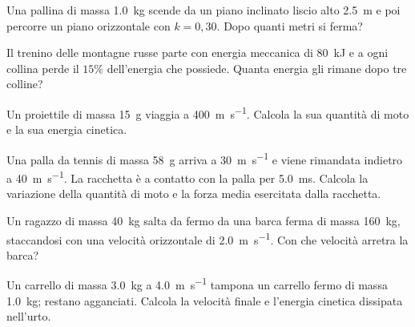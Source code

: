 \begin{esercizio}
Una pallina di massa \SI{1,0}{\kilo\gram} scende da un piano inclinato liscio alto \SI{2,5}{\metre} e poi percorre un piano orizzontale con $k = 0{,}30$. Dopo quanti metri si ferma?\\
\end{esercizio}

\begin{esercizio}
Il trenino delle montagne russe parte con energia meccanica di \SI{80}{\kilo\joule} e a ogni collina perde il $15\%$ dell'energia che possiede. Quanta energia gli rimane dopo tre colline?\\
\end{esercizio}

\begin{esercizio}
Un proiettile di massa \SI{15}{\gram} viaggia a \SI{400}{\metre\per\second}. Calcola la sua quantità di moto e la sua energia cinetica.\\
\end{esercizio}

\begin{esercizio}
Una palla da tennis di massa \SI{58}{\gram} arriva a \SI{30}{\metre\per\second} e viene rimandata indietro a \SI{40}{\metre\per\second}. La racchetta è a contatto con la palla per \SI{5,0}{\milli\second}. Calcola la variazione della quantità di moto e la forza media esercitata dalla racchetta.\\
\end{esercizio}

\begin{esercizio}
Un ragazzo di massa \SI{40}{\kilo\gram} salta da fermo da una barca ferma di massa \SI{160}{\kilo\gram}, staccandosi con una velocità orizzontale di \SI{2,0}{\metre\per\second}. Con che velocità arretra la barca?\\
\end{esercizio}

\begin{esercizio}
Un carrello di massa \SI{3,0}{\kilo\gram} a \SI{4,0}{\metre\per\second} tampona un carrello fermo di massa \SI{1,0}{\kilo\gram}; restano agganciati. Calcola la velocità finale e l'energia cinetica dissipata nell'urto.\\
\end{esercizio}

